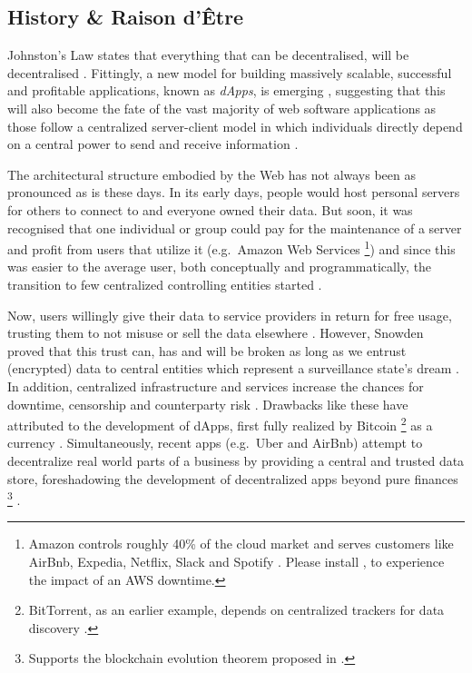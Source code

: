 \subsection{History \& Raison d'Être}
\label{dAppHistory}
Johnston's Law states that everything that can be decentralised, will be decentralised \cite{JohnstonsLaw}. Fittingly, a new model for building massively scalable, successful and profitable applications, known as \textit{\acp{dApp}}, is emerging \cite[p.~5]{Raval.2016} \cite[pp.~1-2]{Johnston2015}, suggesting that this will also become the fate of the vast majority of web software applications as those follow a centralized server-client model in which individuals directly depend on a central power to send and receive information \cite[pp.~7-8]{Raval.2016}. 

The architectural structure embodied by the Web has not always been as pronounced as is these days. In its early days, people would host personal servers for others to connect to and everyone owned their data. But soon, it was recognised that one individual or group could pay for the maintenance of a server and profit from users that utilize it (e.g.~Amazon Web Services \footnote{Amazon controls roughly 40\% of the cloud market and serves customers like AirBnb, Expedia, Netflix, Slack and Spotify \cite{Verge2018}. Please install \cite{fuckOffAWS}, to experience the impact of an AWS downtime.}) and since this was easier to the average user, both conceptually and programmatically, the transition to few centralized controlling entities started \cite[pp.~14]{Raval.2016}. 

Now, users willingly give their data to service providers in return for free usage, trusting them to not misuse or sell the data elsewhere \cite[p.~24]{Raval.2016}. However, Snowden proved that this trust can, has and will be broken as long as we entrust (encrypted) data to central entities which represent a surveillance state's dream \cite{Guardian2013} \cite[p.~25]{Raval.2016}. In addition, centralized infrastructure and services increase the chances for downtime, censorship and \gls{counterparty risk} \cite[p.~23]{Antonopoulos.2018}. Drawbacks like these have attributed to the development of \acp{dApp}, first fully realized by Bitcoin \footnote{BitTorrent, as an earlier example, depends on centralized trackers for data discovery \cite[p.~26]{Raval.2016}.} as a currency \cite[p.~1]{Johnston2015} \cite[p.~1]{bitcoin}. Simultaneously, recent apps (e.g.~Uber and AirBnb) attempt to decentralize real world parts of a business by providing a central and trusted data store, foreshadowing the development of decentralized apps beyond pure finances \footnote{Supports the blockchain evolution theorem proposed in \cite{Swan.2015}.} \cite[p.~15]{Raval.2016}.

